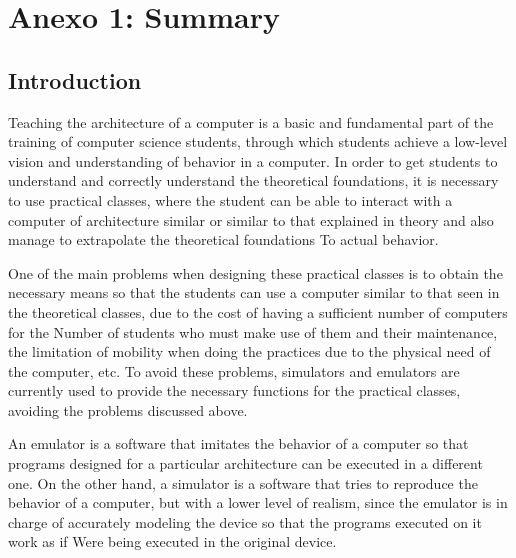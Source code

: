 \chead[]{}
\renewcommand{\headrulewidth}{0.5pt}

\lfoot[]{}
\cfoot[]{}
\rfoot[]{}
\renewcommand{\footrulewidth}{0pt}




\chapter*{Anexo 1: Summary}

\section*{Introduction}

Teaching the architecture of a computer is a basic and fundamental part of the training of computer science students, through which students achieve a low-level vision and understanding of behavior in a computer. In order to get students to understand and correctly understand the theoretical foundations, it is necessary to use practical classes, where the student can be able to interact with a computer of architecture similar or similar to that explained in theory and also manage to extrapolate the theoretical foundations To actual behavior.

One of the main problems when designing these practical classes is to obtain the necessary means so that the students can use a computer similar to that seen in the theoretical classes, due to the cost of having a sufficient number of computers for the Number of students who must make use of them and their maintenance, the limitation of mobility when doing the practices due to the physical need of the computer, etc. To avoid these problems, simulators and emulators are currently used to provide the necessary functions for the practical classes, avoiding the problems discussed above.

An emulator is a software that imitates the behavior of a computer so that programs designed for a particular architecture can be executed in a different one. On the other hand, a simulator is a software that tries to reproduce the behavior of a computer, but with a lower level of realism, since the emulator is in charge of accurately modeling the device so that the programs executed on it work as if Were being executed in the original device.

